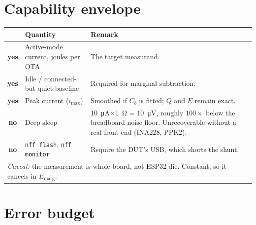 \documentclass[11pt,a4paper]{article}
\newcommand{\yes}{\textcolor{ok}{\textbf{yes}}}
\newcommand{\no}{\textcolor{warn}{\textbf{no}}}
\begin{document}
\medskip
\noindent
{}

\section{Capability envelope}

\begin{center}
\begin{tabularx}{\textwidth}{clX}
\toprule
& \textbf{Quantity} & \textbf{Remark} \\
\midrule
\yes & Active-mode current, joules per OTA & The target measurand. \\
\yes & Idle / connected-but-quiet baseline & Required for marginal subtraction. \\
\yes & Peak current ($i_\text{max}$)       & Smoothed if $C_b$ is fitted; $Q$ and $E$ remain exact. \\
\midrule
\no  & Deep sleep                          & \SI{10}{\micro\ampere}$\times$\SI{1}{\ohm} = \SI{10}{\micro\volt}, roughly $100\times$ below the breadboard noise floor. Unrecoverable without a real front-end (INA228, PPK2). \\
\no  & \texttt{nff flash}, \texttt{nff monitor} & Require the DUT's USB, which shorts the shunt. \\
\midrule
\multicolumn{3}{l}{\textit{Caveat:} the measurement is whole-board, not ESP32-die. Constant, so it cancels in $E_\text{marg}$.} \\
\bottomrule
\end{tabularx}
\end{center}

\section{Error budget}
\end{document}
